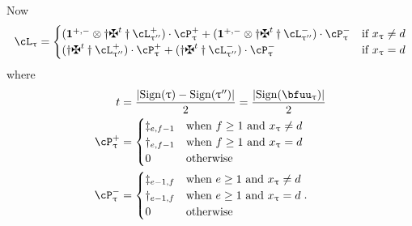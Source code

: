\documentclass[12pt,a4paper]{amsart}
\newcommand{\bfone}{\mathbf{1}}
\def\abs#1{\left|{#1}\right|}
\numberwithin{equation}{section}
\theoremstyle{remark}
\def\ssign{\mathrm{Sign}}
\def\pcL{\cL^+}
\def\ncL{\cL^-}
\def\pcP{\cP^+}
\def\ncP{\cP^-}
\def\uptaupp{\uptau^{\prime\prime}}
\begin{document}
Now
\begin{equation}\label{eq:gd.ls}
  \cL_{\uptau} =
  \begin{cases}
    (\bfone^{+,-}\otimes \dagger\maltese^t \dagger \pcL_{\uptaupp}) \cdot \pcP_{\uptau}
    + (\bfone^{+,-}\otimes \dagger\maltese^{t} \dagger \ncL_{\uptaupp})  \cdot \ncP_{\uptau}
    & \text{if } x_{\uptau} \neq d\\
    (\dagger\maltese^t \dagger \pcL_{\uptaupp}) \cdot \pcP_{\uptau}
    + (\dagger\maltese^{t} \dagger \ncL_{\uptaupp})  \cdot \ncP_{\uptau}
    & \text{if } x_{\uptau} =d\\
  \end{cases}
\end{equation}
where
\[
  \begin{split}
    t & = \frac{\abs{\ssign(\uptau)-\ssign(\uptaupp)}}{2} = \frac{\abs{\ssign(\bfuu_{\uptau})}}{2}\\
    \pcP_{\uptau}& = \begin{cases} \ddagger_{e,f-1} & \text{when
      } f\geq 1 \text{ and } x_{\uptau}\neq d \\
      \dagger_{e,f-1} & \text{when
      } f\geq 1 \text{ and } x_{\uptau}= d \\
      0 & \text{otherwise}
    \end{cases}\\
    \ncP_{\uptau}& = \begin{cases} \ddagger_{e-1,f} & \text{when
      } e\geq 1 \text{ and } x_{\uptau}\neq d \\
      \dagger_{e-1,f} & \text{when
      } e\geq 1 \text{ and } x_{\uptau}= d \\
      0 & \text{otherwise}
    \end{cases}.\\
  \end{split}
\]
%

\medskip
\end{document}
